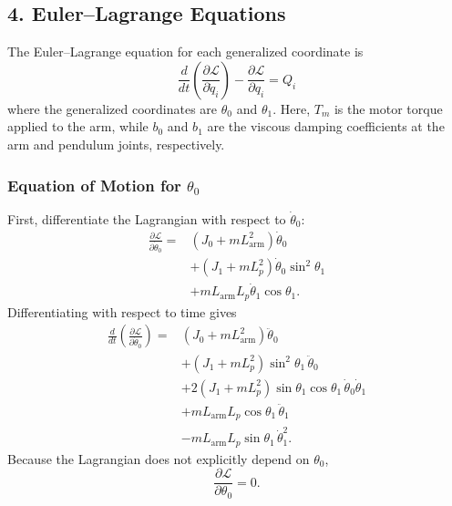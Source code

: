 \documentclass[a4paper,11pt]{article}
\newcommand{\La}{L_{\mathrm{arm}}}
\begin{document}
\subsection{4. Euler--Lagrange Equations}
The Euler--Lagrange equation for each generalized coordinate is
\begin{equation}
  \frac{d}{dt}\left(\frac{\partial \mathcal{L}}{\partial \dot q_i}\right) - \frac{\partial \mathcal{L}}{\partial q_i} = Q_i
\end{equation}
where the generalized coordinates are $\theta_0$ and $\theta_1$. Here, $T_m$ is the motor torque applied to the arm, while $b_0$ and $b_1$ are the viscous damping coefficients at the arm and pendulum joints, respectively.

\subsubsection{Equation of Motion for \texorpdfstring{$\theta_0$}{theta0}}
First, differentiate the Lagrangian with respect to $\dot\theta_0$:
\begin{equation}
\begin{aligned}
  \frac{\partial \mathcal{L}}{\partial \dot\theta_0} = {}& \left(J_0 + m \La^2\right)\dot\theta_0\\
  & + \left(J_1 + m L_p^2\right)\dot\theta_0 \sin^2\theta_1\\
  & + m \La L_p \dot\theta_1 \cos\theta_1 .
\end{aligned}
\end{equation}
Differentiating with respect to time gives
\begin{equation}
\begin{aligned}
  \frac{d}{dt}\left(\frac{\partial \mathcal{L}}{\partial \dot\theta_0}\right) = {}& \left(J_0 + m \La^2\right)\ddot\theta_0\\
  & + \left(J_1 + m L_p^2\right)\sin^2\theta_1\,\ddot\theta_0\\
  & + 2\left(J_1 + m L_p^2\right)\sin\theta_1 \cos\theta_1\,\dot\theta_0 \dot\theta_1\\
  & + m \La L_p \cos\theta_1\,\ddot\theta_1\\
  & - m \La L_p \sin\theta_1\,\dot\theta_1^2 .
\end{aligned}
\end{equation}
Because the Lagrangian does not explicitly depend on $\theta_0$,
\begin{equation}
  \frac{\partial \mathcal{L}}{\partial \theta_0} = 0 .
\end{equation}
\end{document}
